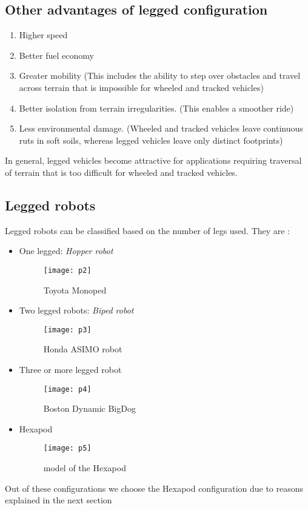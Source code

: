 \documentclass{report}
\begin{document}
\subsection*{Other advantages of legged configuration}
\begin{enumerate}
\item Higher speed
\item Better fuel economy
\item Greater mobility (This includes the ability to step over obstacles and travel across terrain that is impossible for wheeled and tracked vehicles)
\item Better isolation from terrain irregularities. (This enables a smoother ride)
\item Less environmental damage. (Wheeled and tracked vehicles leave continuous ruts in soft soils, whereas legged vehicles leave only distinct footprints)
\end{enumerate}
In general, legged vehicles become attractive for applications requiring traversal of terrain that is too difficult for wheeled and tracked vehicles.   
\subsection{Legged robots}
Legged robots can be classified based on the number of legs used. They are :\\
\begin{itemize}
\item One legged: \emph{Hopper robot}
\begin{figure}[h!]
\centering
\texttt{[image: p2]}
\caption{Toyota Monoped}
\label{fig12}
\end{figure}   
\item Two legged robots: \emph{Biped robot}
\begin{figure}[h!]
\centering
\texttt{[image: p3]}
\caption{Honda ASIMO robot}
\label{fig13}
\end{figure}   
\item Three or more legged robot\\ 
\begin{figure}[h!]
\centering
\texttt{[image: p4]}
\caption{Boston Dynamic BigDog}
\label{fig14}
\end{figure}
\linebreak 
\item Hexapod
\begin{figure}[h!]
\centering
\texttt{[image: p5]}
\caption{model of the Hexapod}
\label{fig15}
\end{figure}   
\end{itemize}
 Out of these configurations we choose the Hexapod configuration due to reasons explained in the next section
\end{document}
